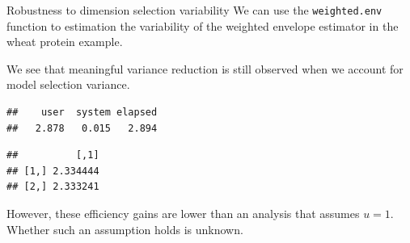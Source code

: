\documentclass[
  ignorenonframetext,
]{beamer}
\newenvironment{Shaded}{\begin{snugshade}}{\end{snugshade}}
\newcommand{\AttributeTok}[1]{\textcolor[rgb]{0.77,0.63,0.00}{#1}}
\newcommand{\DecValTok}[1]{\textcolor[rgb]{0.00,0.00,0.81}{#1}}
\newcommand{\DocumentationTok}[1]{\textcolor[rgb]{0.56,0.35,0.01}{\textbf{\textit{#1}}}}
\newcommand{\FloatTok}[1]{\textcolor[rgb]{0.00,0.00,0.81}{#1}}
\newcommand{\FunctionTok}[1]{\textcolor[rgb]{0.00,0.00,0.00}{#1}}
\newcommand{\NormalTok}[1]{#1}
\newcommand{\OtherTok}[1]{\textcolor[rgb]{0.56,0.35,0.01}{#1}}
\newcommand{\SpecialCharTok}[1]{\textcolor[rgb]{0.00,0.00,0.00}{#1}}
\begin{document}
\begin{frame}[fragile]{Robustness to dimension selection variability}
\protect\hypertarget{robustness-to-dimension-selection-variability}{}
We can use the \texttt{weighted.env} function to estimation the
variability of the weighted envelope estimator in the wheat protein
example.

We see that meaningful variance reduction is still observed when we
account for model selection variance.

\vspace{12pt}
\tiny

\begin{Shaded}
\end{Shaded}

\begin{verbatim}
##    user  system elapsed 
##   2.878   0.015   2.894
\end{verbatim}

\begin{Shaded}
\end{Shaded}

\begin{verbatim}
##          [,1]
## [1,] 2.334444
## [2,] 2.333241
\end{verbatim}
\end{frame}

\begin{frame}[fragile]{}
\protect\hypertarget{section-4}{}
However, these efficiency gains are lower than an analysis that assumes
\(u = 1\). Whether such an assumption holds is unknown.

\vspace{12pt}
\tiny

\begin{Shaded}
\end{Shaded}
\end{frame}
\end{document}
